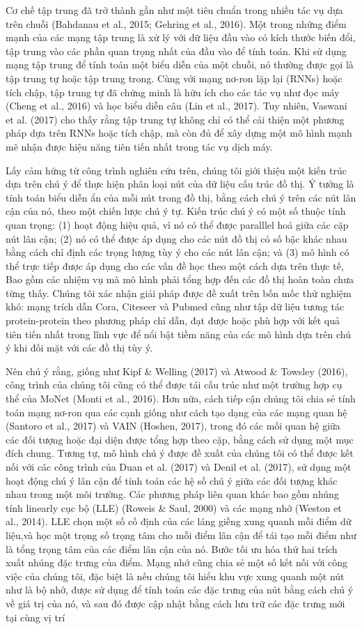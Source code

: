 Cơ chế tập trung đã trở thành gần như một tiêu chuẩn trong nhiều tác vụ dựa trên chuỗi (Bahdanau et al., 2015; Gehring et al., 2016). Một trong những điểm mạnh của các mạng tập trung là xử lý với dữ liệu đầu vào có kích thước biến đổi, tập trung vào các phần quan trọng nhất của đầu vào để tính toán. Khi sử dụng mạng tập trung để tính toán một biểu diễn của một chuỗi, nó thường được gọi là tập trung tự hoặc tập trung trong. Cùng với mạng nơ-ron lặp lại (RNNs) hoặc tích chập, tập trung tự đã chứng minh là hữu ích cho các tác vụ như đọc máy (Cheng et al., 2016) và học biểu diễn câu (Lin et al., 2017). Tuy nhiên, Vaswani et al. (2017) cho thấy rằng tập trung tự không chỉ có thể cải thiện một phương pháp dựa trên RNNs hoặc tích chập, mà còn đủ để xây dựng một mô hình mạnh mẽ nhận được hiệu năng tiên tiến nhất trong tác vụ dịch máy.

Lấy cảm hứng từ công trình nghiên cứu trên, chúng tôi giới thiệu một kiến trúc dựa trên chú ý để thực hiện phân loại nút của dữ liệu cấu trúc đồ thị. Ý tưởng là tính toán biểu diễn ẩn của mỗi nút trong đồ thị, bằng cách chú ý trên các nút lân cận của nó, theo một chiến lược chú ý tự. Kiến trúc chú ý có một số thuộc tính quan trọng: (1) hoạt động hiệu quả, vì nó có thể được paralllel hoá giữa các cặp nút lân cận; (2) nó có thể được áp dụng cho các nút đồ thị có số bậc khác nhau bằng cách chỉ định các trọng lượng tùy ý cho các nút lân cận; và (3) mô hình có thể trực tiếp được áp dụng cho các vấn đề học theo một cách dựa trên thực tế, Bao gồm các nhiệm vụ mà mô hình phải tổng hợp đến các đồ thị hoàn toàn chưa từng thấy. Chúng tôi xác nhận giải pháp được đề xuất trên bốn mốc thử nghiệm khó: mạng trích dẫn Cora, Citeseer và Pubmed cũng như tập dữ liệu tương tác protein-protein theo phương pháp chỉ dẫn, đạt được hoặc phù hợp với kết quả tiên tiến nhất trong lĩnh vực để nổi bật tiềm năng của các mô hình dựa trên chú ý khi đối mặt với các đồ thị tùy ý.

Nên chú ý rằng, giống như Kipf \& Welling (2017) và Atwood \& Towsley (2016), công trình của chúng tôi cũng có thể được tái cấu trúc như một trường hợp cụ thể của MoNet (Monti et al., 2016). Hơn nữa, cách tiếp cận chúng tôi chia sẻ tính toán mạng nơ-ron qua các cạnh giống như cách tạo dạng của các mạng quan hệ (Santoro et al., 2017) và VAIN (Hoshen, 2017), trong đó các mối quan hệ giữa các đối tượng hoặc đại diện được tổng hợp theo cặp, bằng cách sử dụng một mục đích chung. Tương tự, mô hình chú ý được đề xuất của chúng tôi có thể được kết nối với các công trình của Duan et al. (2017) và Denil et al. (2017), sử dụng một hoạt động chú ý lân cận để tính toán các hệ số chú ý giữa các đối tượng khác nhau trong một môi trường. Các phương pháp liên quan khác bao gồm nhúng tính linearly cục bộ (LLE) (Roweis \& Saul, 2000) và các mạng nhớ (Weston et al., 2014). LLE chọn một số cố định của các láng giềng xung quanh mỗi điểm dữ liệu,và học một trọng số trọng tâm cho mỗi điểm lân cận để tái tạo mỗi điểm như là tổng trọng tâm của các điểm lân cận của nó. Bước tối ưu hóa thứ hai trích xuất nhúng đặc trưng của điểm. Mạng nhớ cũng chia sẻ một số kết nối với công việc của chúng tôi, đặc biệt là nếu chúng tôi hiểu khu vực xung quanh một nút như là bộ nhớ, được sử dụng để tính toán các đặc trưng của nút bằng cách chú ý về giá trị của nó, và sau đó được cập nhật bằng cách lưu trữ các đặc trưng mới tại cùng vị trí 